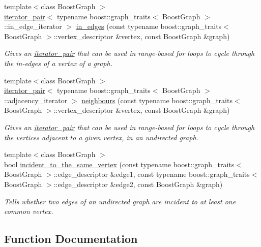 \begin{DoxyCompactItemize}
{\footnotesize template$<$class Boost\+Graph $>$ }\\\hyperlink{classas_1_1iterator__pair}{iterator\+\_\+pair}$<$ typename boost\+::graph\+\_\+traits$<$ Boost\+Graph $>$\+::in\+\_\+edge\+\_\+iterator $>$ \hyperlink{namespaceas_1_1graph_ab75a465b1d5869f0ea8b698f02b067aa}{in\+\_\+edges} (const typename boost\+::graph\+\_\+traits$<$ Boost\+Graph $>$\+::vertex\+\_\+descriptor \&vertex, const Boost\+Graph \&graph)
\begin{DoxyCompactList}\small\item\em Gives an \hyperlink{classas_1_1iterator__pair}{iterator\+\_\+pair} that can be used in range-\/based for loops to cycle through the in-\/edges of a vertex of a graph. \end{DoxyCompactList}\item 
{\footnotesize template$<$class Boost\+Graph $>$ }\\\hyperlink{classas_1_1iterator__pair}{iterator\+\_\+pair}$<$ typename boost\+::graph\+\_\+traits$<$ Boost\+Graph $>$\+::adjacency\+\_\+iterator $>$ \hyperlink{namespaceas_1_1graph_a7a86ebb168cf6ac390a5bd86d3380350}{neighbours} (const typename boost\+::graph\+\_\+traits$<$ Boost\+Graph $>$\+::vertex\+\_\+descriptor \&vertex, const Boost\+Graph \&graph)
\begin{DoxyCompactList}\small\item\em Gives an \hyperlink{classas_1_1iterator__pair}{iterator\+\_\+pair} that can be used in range-\/based for loops to cycle through the vertices adjacent to a given vertex, in an undirected graph. \end{DoxyCompactList}\item 
{\footnotesize template$<$class Boost\+Graph $>$ }\\bool \hyperlink{namespaceas_1_1graph_ac0b52ec1e242ac547157a42aac39e21a}{incident\+\_\+to\+\_\+the\+\_\+same\+\_\+vertex} (const typename boost\+::graph\+\_\+traits$<$ Boost\+Graph $>$\+::edge\+\_\+descriptor \&edge1, const typename boost\+::graph\+\_\+traits$<$ Boost\+Graph $>$\+::edge\+\_\+descriptor \&edge2, const Boost\+Graph \&graph)
\begin{DoxyCompactList}\small\item\em Tells whether two edges of an undirected graph are incident to at least one common vertex. \end{DoxyCompactList}\end{DoxyCompactItemize}


\subsection{Function Documentation}
\mbox{\label{namespaceas_1_1graph_ae44b728c4acaf47bc2bb010831df9452}} 
